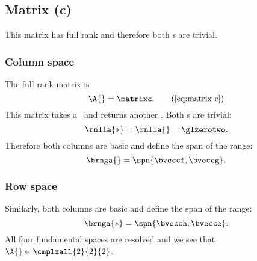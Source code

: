 \subsection{Matrix (c)}
This matrix has full rank and therefore both \ns s are trivial.

\subsubsection{Column space}
The full rank matrix is 
\begin{equation*}
  \A{} = \matrixc.
  \tag{\ref{eq:matrix c}}
\end{equation*}
This matrix takes a \vv \ and returns another \vv. Both \ns s are trivial:
\begin{equation}
  \rnlla{*} = \rnlla{} = \glzerotwo.
\end{equation}
Therefore both columns are basic and define the span of the range:
%
\begin{equation}
  \brnga{} = \spn{ \bveccf, \bveccg }.
\end{equation}
%

\subsubsection{Row space}
Similarly, both columns are basic and define the span of the range:
%
\begin{equation}
  \brnga{*} = \spn{ \bvecch, \bvecce }.
\end{equation}
%
All four fundamental spaces are resolved and we see that $\A{}\in\cmplxall{2}{2}{2}$.

\endinput